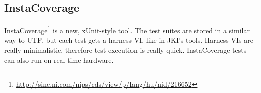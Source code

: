 \subsection{InstaCoverage}
InstaCoverage\footnote{\url{http://sine.ni.com/nips/cds/view/p/lang/hu/nid/216652}} is a new, xUnit-style tool. The test suites are stored in a similar way to UTF, but each test gets a harness VI, like in JKI's tools. Harness VIs are really minimalistic, therefore test execution is really quick. InstaCoverage tests can also run on real-time hardware. \cite{icovsite}